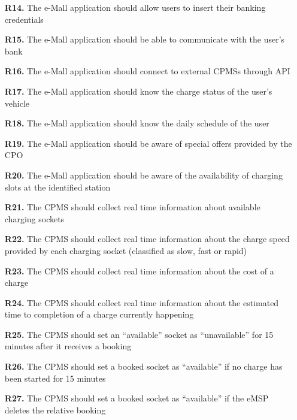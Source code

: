 \documentclass[12pt]{report}
\begin{document}
\begin{itemize}
\item[\textbf{R14.}]The e-Mall application should allow users to insert their banking credentials

\item[\textbf{R15.}]The e-Mall application should be able to communicate with the user’s bank

\item[\textbf{R16.}]The e-Mall application should connect to external CPMSs through API

\item[\textbf{R17.}]The e-Mall application should know the charge status of the user’s vehicle

\item[\textbf{R18.}]The e-Mall application should know the daily schedule of the user

\item[\textbf{R19.}]The e-Mall application should be aware of special offers provided by the CPO

\item[\textbf{R20.}]The e-Mall application should be aware of the availability of charging slots at the identified station

\item[\textbf{R21.}]The CPMS should collect real time information about available charging sockets

\item[\textbf{R22.}]The CPMS should collect real time information about the charge speed provided by each charging socket (classified as slow, fast or rapid)

\item[\textbf{R23.}]The CPMS should collect real time information about the cost of a charge

\item[\textbf{R24.}]The CPMS should collect real time information about the estimated time to completion of a charge currently happening

\item[\textbf{R25.}]The CPMS should set an “available” socket as “unavailable” for 15 minutes after it receives a booking

\item[\textbf{R26.}]The CPMS should set a booked socket as “available” if no charge has been started for 15 minutes

\item[\textbf{R27.}]The CPMS should set a booked socket as “available” if the eMSP deletes the relative booking


\end{itemize}
\end{document}
